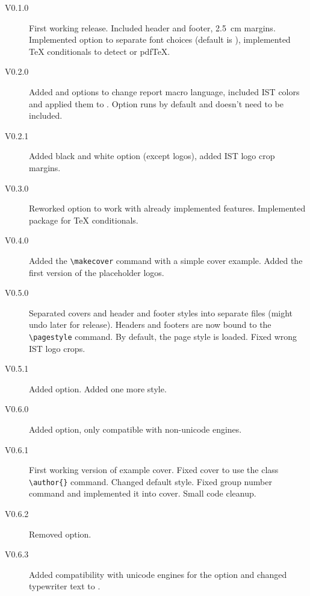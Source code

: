 \documentclass[palatino,english]{ist-report}
\begin{document}
\begin{description}
	\item [V0.1.0] First working release. Included header and footer, \SI{2.5}{\centi\meter} margins. Implemented  option to separate font choices (default is ), implemented \TeX{} conditionals to detect \XeTeX{} or pdf\TeX{}.
	\item [V0.2.0] Added  and  options to change report macro language, included IST colors and applied them to . Option  runs by default and doesn't need to be included.
	\item [V0.2.1] Added black and white option (except logos), added IST logo crop margins.
	\item [V0.3.0] Reworked  option to work with already implemented features. Implemented  package for \TeX{} conditionals.
	\item [V0.4.0] Added the \verb|\makecover| command with a simple cover example. Added the first version of the placeholder logos.
	\item [V0.5.0] Separated covers and header and footer styles into separate files (might undo later for release). Headers and footers are now bound to the \verb|\pagestyle| command. By default, the  page style is loaded. Fixed wrong IST logo crops.
	\item [V0.5.1] Added  option. Added one more style.
	\item [V0.6.0] Added  option, only compatible with non-unicode engines.
	\item [V0.6.1] First working version of example cover. Fixed cover to use the  class \verb|\author{}| command. Changed default style. Fixed group number command and implemented it into cover. Small code cleanup.
	\item [V0.6.2] Removed  option.
	\item [V0.6.3] Added compatibility with unicode engines for the  option and changed typewriter text to .
\end{description}

\pagebreak

\printbibliography
\end{document}
